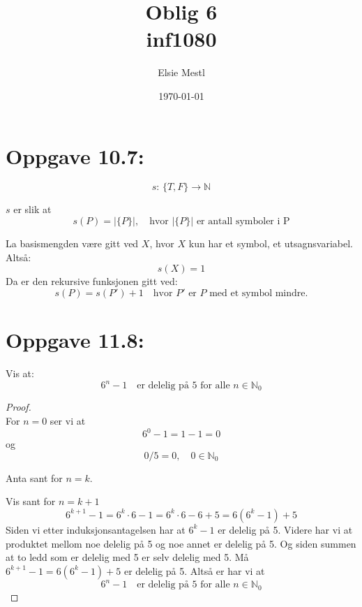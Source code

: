 \documentclass[a4paper, norsk, 10pt]{article}
\date{\today}
\title{Oblig 6 \\ inf1080}
\author{Elsie Mestl}
\begin{document}
\maketitle
\begin{flushleft}


\section*{Oppgave 10.7:}

\[s: \, \{T, F\} \rightarrow \mathbb{N}\]

  $s$ er slik at \[s(P) = |\{P\}|, \quad \text{hvor } |\{P\}| \text{ er antall symboler i P}\]

La basismengden være gitt ved $X$, hvor $X$ kun har et symbol, et utsagnsvariabel. Altså: \[s(X) = 1 \]
Da er den rekursive funksjonen gitt ved:
\[s(P) = s(P') + 1 \quad \text{hvor $P'$ er $P$ med et symbol mindre.} \]
  


\section*{Oppgave 11.8:}
 
Vis at: \[6^{n} -1 \quad \text{er delelig på 5 for alle $n \in \mathbb{N}_{0}$}\]
\begin{proof} \ \\

For $n = 0$ ser vi at \[6^{0} - 1 = 1 - 1 = 0\] og \[0/5  = 0, \quad 0 \in \mathbb{N}_{0}\]

Anta sant for $n = k$.

Vis sant for $n = k+1$
\[6^{k+1} - 1= 6^{k} \cdot 6 - 1 = 6^{k}\cdot 6 -6 +5 = 6(6^{k}  -1 ) + 5\]
Siden vi etter induksjonsantagelsen har at $6^{k} -1$ er delelig på 5. Videre har vi at produktet mellom noe delelig på 5 og noe annet er delelig på 5. Og siden summen at to ledd som er delelig med 5 er selv delelig med 5. Må $6^{k+1} -1  = 6( 6^{k} -1 ) +5$ er delelig på 5. Altså er har vi at
\[6^{n} -1 \quad \text{er delelig på 5 for alle $n \in \mathbb{N}_{0}$}\]
\end{proof}
\end{flushleft}
\end{document}
